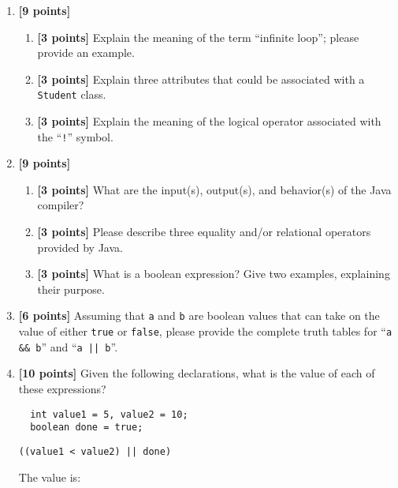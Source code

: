 \begin{enumerate}
\item {\bf [9 points]}
\begin{enumerate}
\item {\bf [3 points]} 
Explain the meaning of the term ``infinite loop''; please provide an example.
\bigskip
\bigskip
\bigskip
\item {\bf [3 points]} 
Explain three attributes that could be associated with a {\tt Student} class.
\bigskip
\bigskip
\bigskip
\bigskip
\item {\bf [3 points]} 
  Explain the meaning of the logical operator associated with the ``{\tt !}'' symbol.
\bigskip
\bigskip
\bigskip
\bigskip
\end{enumerate}
\item {\bf [9 points]}
\begin{enumerate}
\item {\bf [3 points]} 
  What are the input(s), output(s), and behavior(s) of the Java compiler?
\bigskip
\bigskip
\bigskip
\bigskip
\item {\bf [3 points]} 
Please describe three equality and/or relational operators provided by Java.
\bigskip
\bigskip
\bigskip
\bigskip
\item {\bf [3 points]} 
What is a boolean expression? Give two examples, explaining their purpose.
\end{enumerate}
\bigskip
\bigskip
\bigskip
\bigskip

\item {\bf [6 points]}
  Assuming that {\tt a} and {\tt b} are boolean values that can take on the value of either {\tt true} or {\tt false},
  please provide the complete truth tables for ``{\tt a \&\& b}'' and ``{\tt a || b}''.

\vspace{1.2in}

\item {\bf[10 points]} Given the following declarations, what is the value of each of these expressions?

  \begin{verbatim}
  int value1 = 5, value2 = 10;
  boolean done = true;
  \end{verbatim}

  \vspace*{-.35in}
  
\begin{verbatim}
((value1 < value2) || done)
\end{verbatim}

\vspace*{-.175in}
The value is: \mbox{\underline{\hspace{3in}}}


\end{enumerate}
